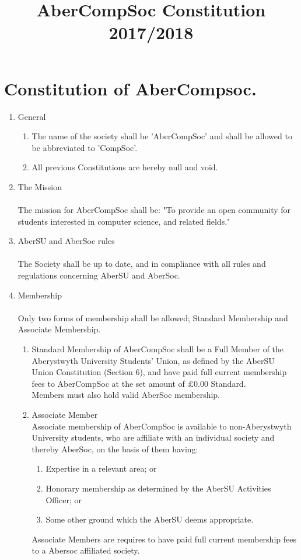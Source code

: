 \documentclass{article}
\begin{document}
\title{AberCompSoc Constitution 2017/2018}
\author{}
\date{}
\maketitle
\part{Constitution of AberCompsoc.}
\begin{enumerate}
    \item General
        \begin{enumerate}
            \item The name of the society shall be 'AberCompSoc' and shall be allowed to be abbreviated to 'CompSoc'.
            \item All previous Constitutions are hereby null and void.
        \end{enumerate}
    \item The Mission
        \\\\ The mission for AberCompSoc shall be: "To provide an open community for students interested in computer science, and related fields."
    \item AberSU and AberSoc rules
        \\\\ The Society shall be up to date, and in compliance with all rules and regulations concerning AberSU and AberSoc. 
    \item Membership
        \\\\ Only two forms of membership shall be allowed; Standard Membership and Associate Membership.
        \begin{enumerate}
            \item Standard Membership of AberCompSoc shall be a Full Member of the Aberystwyth University Students’ Union, as defined by the AberSU Union Constitution (Section 6), and have paid full current membership fees to AberCompSoc at the set amount of £0.00 Standard. \\Members must also hold valid AberSoc membership.
            \item Associate Member 
                \\ Associate membership of AberCompSoc is available to non-Aberystwyth University students, who are affiliate with an individual society and thereby AberSoc, on the basis of them having:
                \begin{enumerate}
                    \item Expertise in a relevant area; or
                    \item Honorary membership as determined by the AberSU Activities Officer; or
                    \item Some other ground which the AberSU deems appropriate.
                \end{enumerate}
                Associate Members are requires to have paid full current membership fees to a Abersoc affiliated society.


\end{enumerate}
\end{enumerate}
\end{document}
